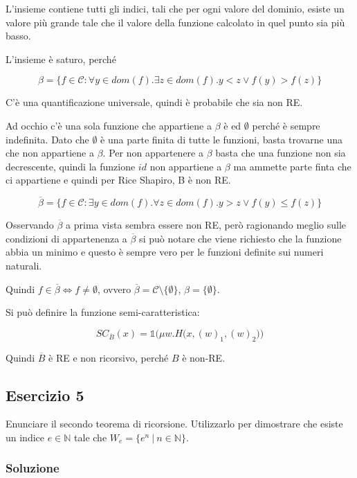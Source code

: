 L'insieme contiene tutti gli indici, tali che per ogni valore del dominio, esiste un valore più grande tale che il valore della funzione calcolato in quel punto sia più basso.

L'insieme è saturo, perché

$$
\beta = \{ f \in \mathcal{C} : \forall y \in dom(f). \exists z \in dom(f). y < z \vee f(y) > f(z) \}
$$

C'è una quantificazione universale, quindi è probabile che sia non RE.

Ad occhio c'è una sola funzione che appartiene a $\beta$ è ed $\emptyset$ perché è sempre indefinita.
Dato che $\emptyset$ è una parte finita di tutte le funzioni, basta trovarne una che non appartiene a $\beta$.
Per non appartenere a $\beta$ basta che una funzione non sia decrescente, quindi la funzione $id$ non appartiene a $\beta$ ma ammette parte finta che ci appartiene e quindi per Rice Shapiro, B è non RE.

$$
\overline{\beta} = \{ f \in \mathcal{C} : \exists y \in dom(f). \forall z \in dom(f). y > z \vee f(y) \leq f(z) \}
$$

Osservando $\overline{\beta}$ a prima vista sembra essere non RE, però ragionando meglio sulle condizioni di appartenenza a $\overline{\beta}$ si può notare che viene richiesto che la funzione abbia un minimo e questo è sempre vero per le funzioni definite sui numeri naturali.

Quindi $f \in \overline{\beta} \Leftrightarrow f \neq \emptyset$, ovvero $\overline{\beta} = \mathcal{C} \setminus \{ \emptyset \}$, $\beta = \{\emptyset\}$.

Si può definire la funzione semi-caratteristica:

$$
SC_{\overline{B}}(x) = \mathbb{1}\bigg(  \mu w. H\Big( x, (w)_1, (w)_2\Big) \bigg)
$$ 

Quindi $\overline{B}$ è RE e non ricorsivo, perché $B$ è non-RE.

\subsection{Esercizio 5}

Enunciare il secondo teorema di ricorsione. Utilizzarlo per dimostrare che esiste un indice $e \in \mathbb{N}$ tale che $W_e = \{e^n \: |\: n \in \mathbb{N} \}$.

\subsubsection{Soluzione}

